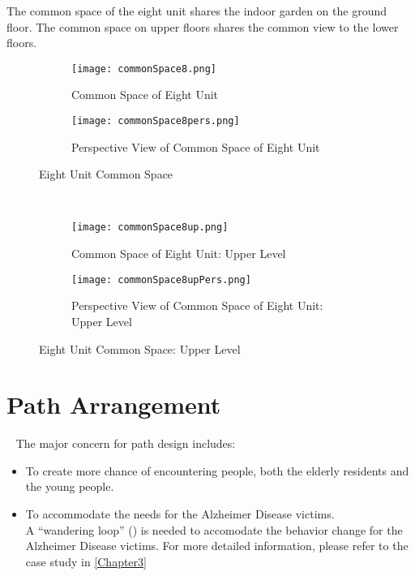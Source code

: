 The common space of the eight unit shares the indoor garden on the
ground floor. The common space on upper floors shares the common view
to the lower floors.~
\begin{figure}
\centering
\begin{subfigure}{\textwidth}
  \centering
  \texttt{[image: commonSpace8.png]}
  \caption{Common Space of Eight Unit}
  \label{fig:commonSpace8}
\end{subfigure}
\begin{subfigure}{\textwidth}
  \centering
  \texttt{[image: commonSpace8pers.png]}
  \caption{Perspective View of Common Space of Eight Unit}
  \label{fig:commonSpace8pers}
\end{subfigure}
\caption{Eight Unit Common Space}
\label{fig:eightUnitCommonSpace}
\end{figure}
~
\begin{figure}
\centering
\begin{subfigure}{\textwidth}
  \centering
  \texttt{[image: commonSpace8up.png]}
  \caption{Common Space of Eight Unit: Upper Level}
  \label{fig:commonSpace8}
\end{subfigure}
\begin{subfigure}{\textwidth}
  \centering
  \texttt{[image: commonSpace8upPers.png]}
  \caption{Perspective View of Common Space of Eight Unit: Upper Level}
  \label{fig:commonSpace8pers}
\end{subfigure}
\caption{Eight Unit Common Space: Upper Level}
\label{fig:eightUnitCommonSpaceUp}
\end{figure}

\clearpage
\section{Path Arrangement}~
The major concern for path design includes:
\begin{itemize}
\item To create more chance of encountering people, both the elderly
  residents and the young people.
\item To accommodate the needs for the Alzheimer Disease victims. \\A
  ``wandering loop'' () is needed to accomodate the
  behavior change for the Alzheimer Disease victims. For more detailed
  information, please refer to the case study in \cref{Chapter3}
\end{itemize}

